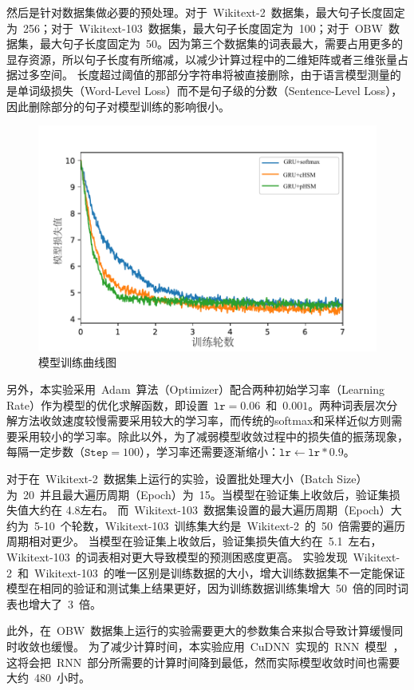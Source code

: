 然后是针对数据集做必要的预处理。对于~Wikitext-2~数据集，最大句子长度固定为~256；对于~Wikitext-103~数据集，最大句子长度固定为~100；对于~OBW~数据集，最大句子长度固定为~50。因为第三个数据集的词表最大，需要占用更多的显存资源，所以句子长度有所缩减，以减少计算过程中的二维矩阵或者三维张量占据过多空间。
长度超过阈值的那部分字符串将被直接删除，由于语言模型测量的是单词级损失（Word-Level Loss）而不是句子级的分数（Sentence-Level Loss），因此删除部分的句子对模型训练的影响很小。

\begin{figure}[!t]
  \centering
  \includegraphics[width=0.6\columnwidth]{./figures/learn2.pdf}
  \caption{模型训练曲线图}
\end{figure}

另外，本实验采用~Adam~算法（Optimizer）配合两种初始学习率（Learning Rate）作为模型的优化求解函数，即设置~$\mathtt{lr}=0.06$~和~$0.001$。两种词表层次分解方法收敛速度较慢需要采用较大的学习率，而传统的softmax和采样近似方则需要采用较小的学习率。除此以外，为了减弱模型收敛过程中的损失值的振荡现象，每隔一定步数（$\texttt{Step} =100$），学习率还需要逐渐缩小：$\texttt{lr}\leftarrow\texttt{lr}*0.9$。

对于在~Wikitext-2~数据集上运行的实验，设置批处理大小（Batch Size）为~20~并且最大遍历周期（Epoch）为~15。当模型在验证集上收敛后，验证集损失值大约在 4.8左右。
而~Wikitext-103~数据集设置的最大遍历周期（Epoch）大约为~5-10~个轮数，Wikitext-103~训练集大约是~Wikitext-2~的~50~倍需要的遍历周期相对更少。
当模型在验证集上收敛后，验证集损失值大约在~5.1~左右，Wikitext-103~的词表相对更大导致模型的预测困惑度更高。
实验发现~Wikitext-2~和~Wikitext-103~的唯一区别是训练数据的大小，增大训练数据集不一定能保证模型在相同的验证和测试集上结果更好，因为训练数据训练集增大~50~倍的同时词表也增大了~3~倍。

此外，在~OBW~数据集上运行的实验需要更大的参数集合来拟合导致计算缓慢同时收敛也缓慢。
为了减少计算时间，本实验应用~CuDNN~实现的~RNN~模型~，这将会把~RNN~部分所需要的计算时间降到最低，然而实际模型收敛时间也需要大约~480~小时。

